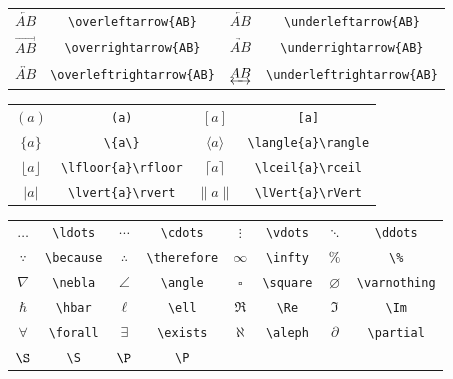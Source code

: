 \documentclass[a4paper,10pt]{article}
\begin{document}
    \begin{table}[!htbp]
        \centering
        \begin{tabular}{cccc}
            $\overleftarrow{AB}$ & \verb|\overleftarrow{AB}| &
            $\underleftarrow{AB}$ & \verb|\underleftarrow{AB}| \\
            $\overrightarrow{AB}$ & \verb|\overrightarrow{AB}| &
            $\underrightarrow{AB}$ & \verb|\underrightarrow{AB}| \\
            $\overleftrightarrow{AB}$ & \verb|\overleftrightarrow{AB}| &
            $\underleftrightarrow{AB}$ & \verb|\underleftrightarrow{AB}| \\
        \end{tabular}
    \end{table}
    \begin{table}[!htbp]
        \centering
        \begin{tabular}{cccc}
            $(a)$ & \verb|(a)| &
            $[a]$ & \verb|[a]| \\
            $\{a\}$ & \verb|\{a\}| &
            $\langle{a}\rangle$ & \verb|\langle{a}\rangle| \\
            $\lfloor{a}\rfloor$ & \verb|\lfloor{a}\rfloor| &
            $\lceil{a}\rceil$ & \verb|\lceil{a}\rceil| \\
            $\lvert{a}\rvert$ & \verb|\lvert{a}\rvert| &
            $\lVert{a}\rVert$ & \verb|\lVert{a}\rVert| \\
        \end{tabular}
    \end{table}
    \begin{table}[!htbp]
        \centering
        \begin{tabular}{cccccccc}
            $\ldots$ & \verb|\ldots| &
            $\cdots$ & \verb|\cdots| &
            $\vdots$ & \verb|\vdots| &
            $\ddots$ & \verb|\ddots| \\
            $\because$ & \verb|\because| &
            $\therefore$ & \verb|\therefore| &
            $\infty$ & \verb|\infty| &
            $\%$ & \verb|\%| \\
            $\nabla$ & \verb|\nebla| &
            $\angle$ & \verb|\angle| &
            $\square$ & \verb|\square| &
            $\varnothing$ & \verb|\varnothing| \\
            $\hbar$ & \verb|\hbar| &
            $\ell$ & \verb|\ell| &
            $\Re$ & \verb|\Re| &
            $\Im$ & \verb|\Im| \\
            $\forall$ & \verb|\forall| &
            $\exists$ & \verb|\exists| &
            $\aleph$ & \verb|\aleph| &
            $\partial$ & \verb|\partial| \\
            $\S$ & \verb|\S| &
            $\P$ & \verb|\P| \\
        \end{tabular}
    \end{table}
\end{document}
